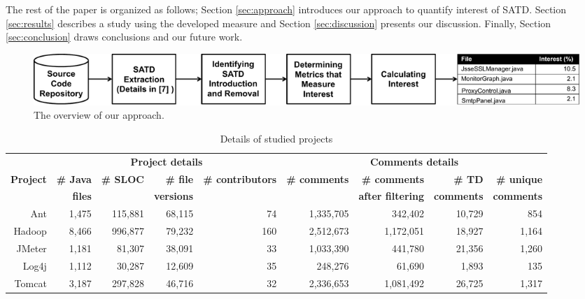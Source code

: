 \documentclass[10pt, conference]{IEEEtran}
\begin{document}
The rest of the paper is organized as follows; Section \ref{sec:approach} introduces our approach to quantify interest of SATD. Section \ref{sec:results} describes a study using the developed measure and Section \ref{sec:discussion} presents our discussion. Finally, Section \ref{sec:conclusion} draws conclusions and our future work.

\begin{figure}[!t]
  \begin{center}
  \includegraphics[width=.95\textwidth]{figures/overview}
  \caption{The overview of our approach.}
  \label{fig:overview}
  \end{center}
\end{figure}

\begin{table}[tb]
  \caption{Details of studied projects}
  \label{tab:projects}
  \centering

  \begin{tabular}{r|rrrr|rrrr}
  \hline
\textbf{} & \multicolumn{4}{c|}{\textbf{Project details}} & \multicolumn{4}{c}{\textbf{Comments details}} \\ \cline{2-9}
\textbf{Project} & \textbf{\# Java} & \textbf{\# SLOC} & \textbf{\# file} & \textbf{\# contributors} & \textbf{\# comments} & \textbf{\# comments} & \textbf{\# TD} & \textbf{\# unique} \\
\textbf{} & \textbf{files} & & \textbf{versions} & & & \textbf{after filtering} & \textbf{ comments} & \textbf{comments} \\
  \hline
Ant        &1,475 & 115,881 & 68,115 & 74 & 1,335,705 & 342,402 & 10,729 &  854  \\
Hadoop     &8,466 & 996,877 & 79,232 &160 & 2,512,673 & 1,172,051 & 18,927 & 1,164 \\
JMeter     &1,181 & 81,307  & 38,091 & 33 & 1,033,390 & 441,780 & 21,356 & 1,260 \\
Log4j      &1,112 & 30,287  & 12,609 & 35 &   248,276 &  61,690 &  1,893 &   135 \\
Tomcat     &3,187 & 297,828 & 46,716 & 32 & 2,336,653 & 1,081,492 & 26,725 & 1,317 \\
  \hline
  \end{tabular}
\end{table}
\end{document}
